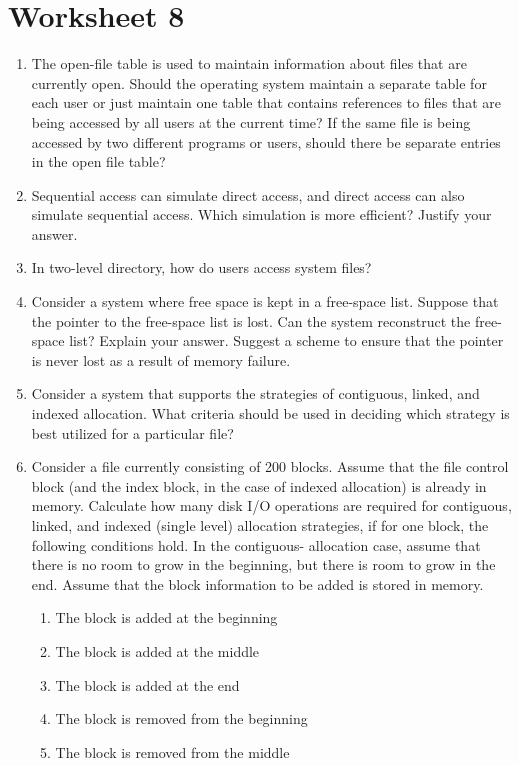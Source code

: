 \documentclass{article}
\begin{document}
	\section{Worksheet 8}
	\begin{enumerate}
		\item The open-file table is used to maintain information about files that are currently open. Should the operating system maintain a separate table for each user or just maintain one table that contains references to files that are being accessed by all users at the current time? If the same file is being accessed by two different programs or users, should there be separate entries in the open file table?
		\item Sequential access can simulate direct access, and direct access can also simulate sequential access. Which simulation is more efficient? Justify your answer.
		\item In two-level directory, how do users access system files?
		\item Consider a system where free space is kept in a free-space list. Suppose that the pointer to the free-space list is lost. Can the system reconstruct the free-space list? Explain your answer. Suggest a scheme to ensure that the pointer is never lost as a result of memory failure.
		\item Consider a system that supports the strategies of contiguous, linked, and indexed allocation. What criteria should be used in deciding which strategy is best utilized for a particular file?
		\item Consider a file currently consisting of 200 blocks. Assume that the file control block (and the index block, in the case of indexed allocation) is already in memory. Calculate how many disk I/O operations are required for contiguous, linked, and indexed (single level) allocation strategies, if for one block, the following conditions hold. In the contiguous- allocation case, assume that there is no room to grow in the beginning, but there is room to grow in the end. Assume that the block information to be added is stored in memory.
		\begin{enumerate}
			\item The block is added at the beginning
			\item The block is added at the middle
			\item The block is added at the end
			\item The block is removed from the beginning
			\item The block is removed from the middle

\end{enumerate}
\end{enumerate}
\end{document}
